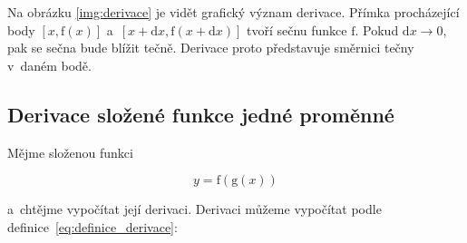 Na obrázku \ref{img:derivace} je vidět grafický význam derivace. Přímka procházející body \([x, \mathrm{f}(x)]\) a~\([x + \mathrm{d}x, \mathrm{f}(x + \mathrm{d}x)]\) tvoří sečnu funkce \(\mathrm{f}\). Pokud \(\mathrm{d}x \to 0\), pak se sečna bude blížit tečně. Derivace proto představuje směrnici tečny v~daném bodě.

\subsection{Derivace složené funkce jedné proměnné}

Mějme složenou funkci

\begin{equation}
y = \mathrm{f}(\mathrm{g}(x))
\end{equation}

a~chtějme vypočítat její derivaci. Derivaci můžeme vypočítat podle definice~\eqref{eq:definice_derivace}:

